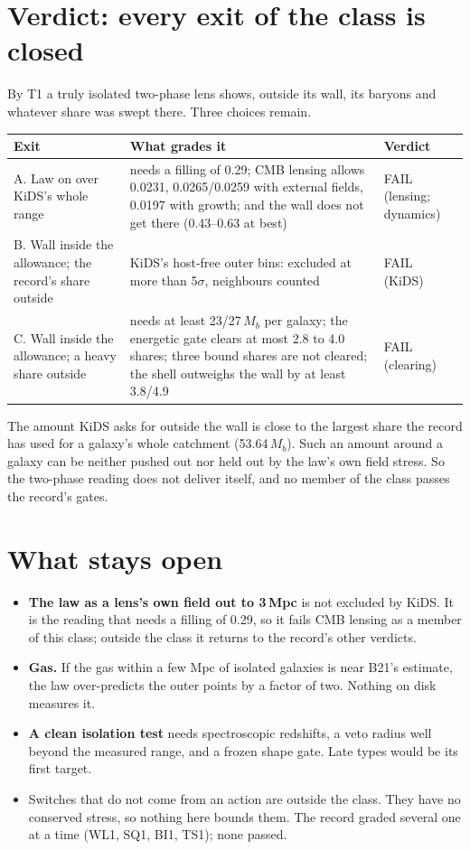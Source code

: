 \documentclass[10pt]{article}
\begin{document}
\section{Verdict: every exit of the class is closed}
By T1 a truly isolated two-phase lens shows, outside its wall, its baryons and whatever share was swept there. Three choices remain.
\begin{center}\small
\begin{tabular}{@{}p{4.9cm}p{8.4cm}p{2.6cm}@{}}\toprule
Exit & What grades it & Verdict\\\midrule
A. Law on over KiDS's whole range & needs a filling of 0.29; CMB lensing allows 0.0231, 0.0265/0.0259 with external fields, 0.0197 with growth; and the wall does not get there (0.43--0.63 at best) & FAIL (lensing; dynamics)\\
B. Wall inside the allowance; the record's share outside & KiDS's host-free outer bins: excluded at more than 5$\sigma$, neighbours counted & FAIL (KiDS)\\
C. Wall inside the allowance; a heavy share outside & needs at least 23/27\,$M_b$ per galaxy; the energetic gate clears at most 2.8 to 4.0 shares; three bound shares are not cleared; the shell outweighs the wall by at least 3.8/4.9 & FAIL (clearing)\\\bottomrule
\end{tabular}\end{center}
The amount KiDS asks for outside the wall is close to the largest share the record has used for a galaxy's whole catchment (53.64\,$M_b$). Such an amount around a galaxy can be neither pushed out nor held out by the law's own field stress. So the two-phase reading does not deliver itself, and no member of the class passes the record's gates.

\section{What stays open}
\begin{itemize}
\item \textbf{The law as a lens's own field out to 3\,Mpc} is not excluded by KiDS. It is the reading that needs a filling of 0.29, so it fails CMB lensing as a member of this class; outside the class it returns to the record's other verdicts.
\item \textbf{Gas.} If the gas within a few Mpc of isolated galaxies is near B21's estimate, the law over-predicts the outer points by a factor of two. Nothing on disk measures it.
\item \textbf{A clean isolation test} needs spectroscopic redshifts, a veto radius well beyond the measured range, and a frozen shape gate. Late types would be its first target.
\item Switches that do not come from an action are outside the class. They have no conserved stress, so nothing here bounds them. The record graded several one at a time (WL1, SQ1, BI1, TS1); none passed.
\end{itemize}
\end{document}
